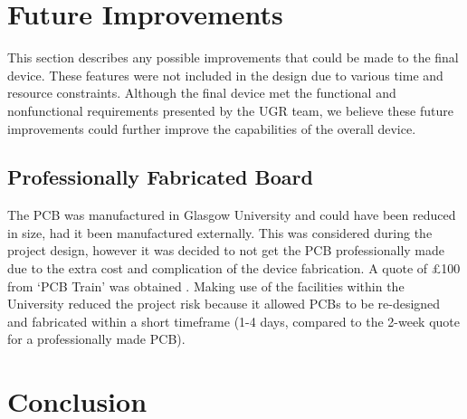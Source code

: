 \documentclass[a4paper,12pt]{article}
\begin{document}

\newpage
\section{Future Improvements}
\label{sec:future_improvements}

This section describes any possible improvements that could be made to the final device. These features were not included in the design due to various time and resource constraints. Although the final device met the functional and nonfunctional requirements presented by the UGR team, we believe these future improvements could further improve the capabilities of the overall device.

\subsection{Professionally Fabricated Board}
\label{sec:future_improvement_1}

The PCB was manufactured in Glasgow University and could have been reduced in size, had it been manufactured externally. This was considered during the project design, however it was decided to not get the PCB professionally made due to the extra cost and complication of the device fabrication. A quote of £100 from ‘PCB Train’ was obtained \cite{pcb_train}. Making use of the facilities within the University reduced the project risk because it allowed PCBs to be re-designed and fabricated within a short timeframe (1-4 days, compared to the 2-week quote for a professionally made PCB).


\section{Conclusion}
\label{sec:conclusion}




\newpage



\end{document}
